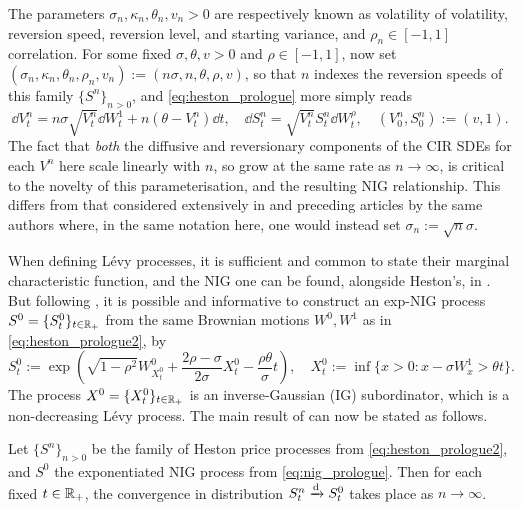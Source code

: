 The parameters $\sigma_n,\kappa_n,\theta_n, v_n >0$ are respectively known as volatility of volatility, reversion speed, reversion level, and starting variance, and $\rho_n\in[-1,1]$ correlation. For some fixed $\sigma,\theta,v>0$ and $\rho\in[-1,1]$, now set $(\sigma_n,\kappa_n,\theta_n,\rho_n,v_n):=(n\sigma,n,\theta,\rho,v)$, so that $n$ indexes the reversion speeds of this family $\{S^n\}_{n>0}$, and \autoref{eq:heston_prologue} more simply reads
\begin{equation}\label{eq:heston_prologue2}
    \dd V^n_t = n\sigma\sqrt{V^n_t}\dd W^1_t + n(\theta - V^n_t)\dd t,\quad \dd S^n_t = \sqrt{V^n_t}S^n_t\dd W^{\rho}_t,\quad (V^n_0,S^n_0) := (v,1).
\end{equation}
The fact that \emph{both} the diffusive and reversionary components of the CIR SDEs for each $V^n$ here scale linearly with $n$, so grow at the same rate as $n\to\infty$, is critical to the novelty of this parameterisation, and the resulting NIG relationship. This differs from that considered extensively in \cite{fouque_2011} and preceding articles by the same authors where, in the same notation here, one would instead set $\sigma_n:=\sqrt{n}\sigma$.

When defining L\'evy processes, it is sufficient and common to state their marginal characteristic function, and the NIG one can be found, alongside Heston's, in \cite{mechkov_2015}. But following \cite{applebaum_2009}, it is possible and informative to construct an exp-NIG process $S^0=\{S^0_t\}_{t\in\mathbb{R}_+}$ from the same Brownian motions $W^0,W^1$ as in \autoref{eq:heston_prologue2}, by
\begin{equation}\label{eq:nig_prologue}
    S^0_t := \exp\left(\sqrt{1-\rho^2}W^0_{X^0_t} + \frac{2\rho-\sigma}{2\sigma}X^0_t -\frac{\rho\theta}{\sigma} t\right),\quad X^0_t:=\inf\bigg\{x>0:x-\sigma W^1_x > \theta t\bigg\}.
\end{equation}
The process $X^0=\{X^0_t\}_{t\in\mathbb{R}_+}$ is an inverse-Gaussian (IG) subordinator, which is a non-decreasing L\'evy process. The main result of \cite{mechkov_2015} can now be stated as follows.
\begin{theorem}\label{thm:mech_pro}
    Let $\{S^n\}_{n>0}$ be the family of Heston price processes from \autoref{eq:heston_prologue2}, and $S^0$ the exponentiated NIG process from \autoref{eq:nig_prologue}. Then for each fixed $t\in\mathbb{R}_+$, the convergence in distribution $S^n_t\xrightarrow{\mathrm{d}} S^0_t$ takes place as $n\to\infty$.
\end{theorem}

